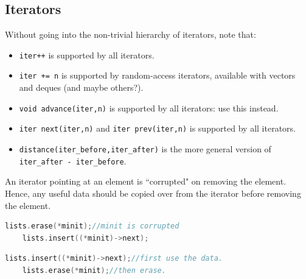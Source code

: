 \documentclass{report}
\begin{document}
\subsection{Iterators}
Without going into the non-trivial hierarchy of iterators, note that:
\begin{itemize}
    \item \texttt{iter++} is supported by all iterators.
    \item \texttt{iter += n} is supported by random-access iterators, available with vectors and deques (and maybe others?).
    \item \texttt{void advance(iter,n)} is supported by all iterators: use this instead.
    \item \texttt{iter next(iter,n)} and \texttt{iter prev(iter,n)} is supported by all iterators.
    \item \texttt{distance(iter\_before,iter\_after)} is the more general version of \texttt{iter\_after - iter\_before}.
\end{itemize}
An iterator pointing at an element is ``corrupted" on removing the element.
Hence, any useful data should be copied over from the iterator before removing the element.
\begin{lstlisting}[caption={Undefined behaviour},language=C++]
    lists.erase(*minit);//minit is corrupted
    lists.insert((*minit)->next);
\end{lstlisting}
\begin{lstlisting}[caption={Working code},language=C++]
    lists.insert((*minit)->next);//first use the data.
    lists.erase(*minit);//then erase.
\end{lstlisting}
\end{document}

